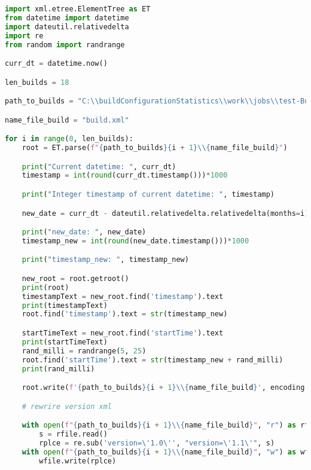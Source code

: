 \begin{lstlisting}[language=Python]
import xml.etree.ElementTree as ET
from datetime import datetime
import dateutil.relativedelta
import re
from random import randrange

curr_dt = datetime.now()

len_builds = 18

path_to_builds = "C:\\buildConfigurationStatistics\\work\\jobs\\test-Build-frontend-maven-plugin\\builds\\"

name_file_build = "build.xml"

for i in range(0, len_builds):
    root = ET.parse(f"{path_to_builds}{i + 1}\\{name_file_build}")

    print("Current datetime: ", curr_dt)
    timestamp = int(round(curr_dt.timestamp()))*1000

    print("Integer timestamp of current datetime: ", timestamp)

    new_date = curr_dt - dateutil.relativedelta.relativedelta(months=i)

    print("new_date: ", new_date)
    timestamp_new = int(round(new_date.timestamp()))*1000

    print("timestamp_new: ", timestamp_new)

    new_root = root.getroot()
    print(root)
    timestampText = new_root.find('timestamp').text
    print(timestampText)
    root.find('timestamp').text = str(timestamp_new)

    startTimeText = new_root.find('startTime').text
    print(startTimeText)
    rand_milli = randrange(5, 25)
    root.find('startTime').text = str(timestamp_new + rand_milli)
    print(rand_milli)

    root.write(f'{path_to_builds}{i + 1}\\{name_file_build}', encoding = "UTF-8", xml_declaration = True)

    # rewrire version xml

    with open(f"{path_to_builds}{i + 1}\\{name_file_build}", "r") as rfile:
        s = rfile.read()
        rplce = re.sub('version=\'1.0\'', "version=\'1.1\'", s)
    with open(f"{path_to_builds}{i + 1}\\{name_file_build}", "w") as wfile:
        wfile.write(rplce)

   
\end{lstlisting}


